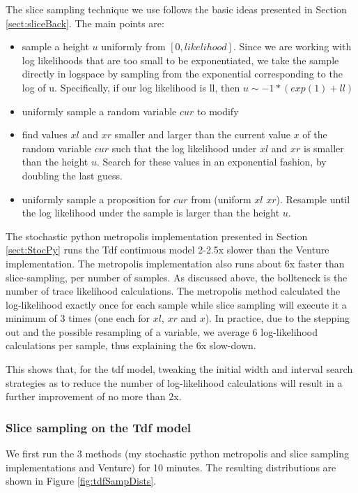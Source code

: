 The slice sampling technique we use follows the basic ideas presented in Section \ref{sect:sliceBack}. The main points are:
\begin{itemize}

\item
sample a height $u$ uniformly from $[0, likelihood]$. Since we are working with log likelihoods that are too small to be exponentiated, we take the sample directly in logspace by sampling from the exponential corresponding to the log of u. Specifically, if our log likelihood is ll, then $u \sim -1 * (exp(1) + ll)$

\item
uniformly sample a random variable $cur$ to modify

\item
find values $xl$ and $xr$ smaller and larger than the current value $x$ of the random variable $cur$ such that the log likelihood under $xl$ and $xr$ is smaller than the height $u$. Search for these values in an exponential fashion, by doubling the last guess.

\item
uniformly sample a proposition for $cur$ from (uniform $xl$ $xr$). Resample until the log likelihood under the sample is larger than the height $u$.

\end{itemize}

The stochastic python metropolis implementation presented in Section \ref{sect:StocPy} runs the Tdf continuous model 2-2.5x slower than the Venture implementation. The metropolis implementation also runs about 6x faster than slice-sampling, per number of samples. As discussed above, the bollteneck is the number of trace likelihood calculations. The metropolis method calculated the log-likelihood exactly once for each sample while slice sampling will execute it a minimum of 3 times (one each for $xl$, $xr$ and $x$). In practice, due to the stepping out and the possible resampling of a variable, we average 6 log-likelihood calculations per sample, thus explaining the 6x slow-down.

This shows that, for the tdf model, tweaking the initial width and interval search strategies as to reduce the number of log-likelihood calculations will result in a further improvement of no more than 2x.

\subsubsection{Slice sampling on the Tdf model}
We first run the 3 methods (my stochastic python metropolis and slice sampling implementations and Venture) for 10 minutes. The resulting distributions are shown in Figure \ref{fig:tdfSampDists}.


